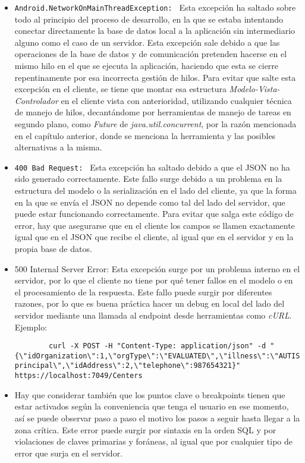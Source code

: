 \begin{itemize}
    \item \texttt{Android.NetworkOnMainThreadException: } Esta excepción ha
    saltado sobre todo al principio del proceso de desarrollo, en la que se
    estaba intentando conectar directamente la base de datos local a la
    aplicación sin intermediario alguno como el caso de un servidor. Esta
    excepción sale debido a que las operaciones de la base de datos y de
    comunicación pretenden hacerse en el mismo hilo en el que se ejecuta la
    aplicación, haciendo que esta se cierre repentinamente por esa incorrecta
    gestión de hilos. Para evitar que salte esta excepción en el cliente, se
    tiene que montar esa estructura \textit{Modelo-Vista-Controlador} en el
    cliente vista con anterioridad, utilizando cualquier técnica de manejo de
    hilos, decantándome por herramientas de manejo de tareas en segundo plano,
    como \textit{Future} de \textit{java.util.concurrent}, por la razón
    mencionada en el capítulo anterior, donde se menciona la herramienta y las
    posibles alternativas a la misma.
    \item \texttt{400 Bad Request: } Esta excepción ha saltado debido a que el
    JSON no ha sido generado correctamente. Este fallo surge debido a un
    problema en la estructura del modelo o la serialización en el lado del
    cliente, ya que la forma en la que se envía el JSON no depende como tal del
    lado del servidor, que puede estar funcionando correctamente. Para evitar
    que salga este código de error, hay que asegurarse que en el cliente los
    campos se llamen exactamente igual que en el JSON que recibe el cliente, al
    igual que en el servidor y en la propia base de datos.
    \item {500 Internal Server Error: } Esta excepción surge por un problema interno en el servidor, por lo que el cliente no tiene por qué tener fallos en el modelo o en el procesamiento de la respuesta. Este fallo puede surgir por diferentes razones, por lo que es buena práctica hacer un debug en local del lado del servidor mediante una llamada al endpoint desde herramientas como  \textit{cURL}. Ejemplo: \begin{lstlisting}
        curl -X POST -H "Content-Type: application/json" -d "{\"idOrganization\":1,\"orgType\":\"EVALUATED\",\"illness\":\"AUTISM\",\"idCenter\":1,\"centerDescription\":\"Sede principal\",\"idAddress\":2,\"telephone\":987654321}" https://localhost:7049/Centers
    \end{lstlisting}
    \item 
    Hay que considerar también que los puntos clave o breakpoints tienen que
    estar activados según la conveniencia que tenga el usuario en ese momento,
    así se puede observar paso a paso el motivo los pasos a seguir hasta llegar
    a la zona crítica. Este error puede surgir por sintaxis en la orden SQL y
    por violaciones de claves primarias y foráneas, al igual que por cualquier
    tipo de error que surja en el servidor.
\end{itemize}

